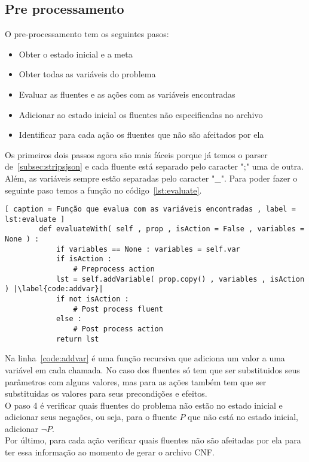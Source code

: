 \subsection{Pre processamento}
	O pre-processamento tem os seguintes pasos:
		\begin{itemize}
			\item Obter o estado inicial e a meta
			\item Obter todas as variáveis do problema
			\item Evaluar as fluentes e as ações com as variáveis encontradas
			\item Adicionar ao estado inicial os fluentes não especificadas no archivo
			\item Identificar para cada ação os fluentes que não são afeitados por ela
		\end{itemize}
	Os primeiros dois passos agora são mais fáceis porque já temos o parser de~\ref{subsec:stripsjson} e cada fluente está separado pelo caracter ";" uma de outra. Além, as variáveis sempre estão separadas pelo caracter "\_".
	Para poder fazer o seguinte paso temos a função no código~\ref{lst:evaluate}.
	\begin{lstlisting}[ caption = Função que evalua com as variáveis encontradas , label = lst:evaluate ]
		def evaluateWith( self , prop , isAction = False , variables = None ) :
			if variables == None : variables = self.var
			if isAction :
				# Preprocess action
			lst = self.addVariable( prop.copy() , variables , isAction ) |\label{code:addvar}|
			if not isAction :
				# Post process fluent
			else :
				# Post process action
			return lst
	\end{lstlisting}
	Na linha~\ref{code:addvar} é uma função recursiva que adiciona um valor a uma variável em cada chamada. No caso dos fluentes só tem que ser substituidos seus parâmetros com alguns valores, mas para as ações também tem que ser substituidas os valores para seus precondições e efeitos.\\
	O paso 4 é verificar quais fluentes do problema não estão no estado inicial e adicionar seus negações, ou seja, para o fluente $P$ que não está no estado inicial, adicionar $\lnot P$.\\
	Por último, para cada ação verificar quais fluentes não são afeitadas por ela para ter essa informação ao momento de gerar o archivo CNF.
		
